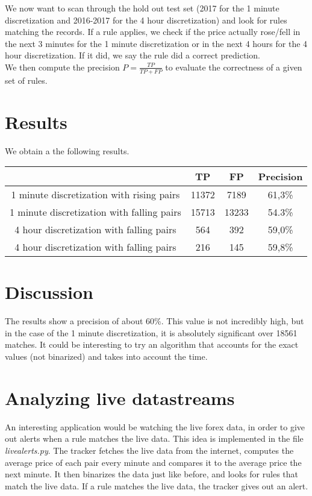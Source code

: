 \documentclass[paper=a4,fontsize=11pt,DIV=8,BCOR=5mm,twoside,pdftex]{scrartcl}
\begin{document}
	 We now want to scan through the hold out test set (2017 for the 1 minute discretization and 2016-2017 for the 4 hour discretization) and look for rules matching the records. If a rule applies, we check if the price actually rose/fell in the next 3 minutes for the 1 minute discretization or in the next 4 hours for the 4 hour discretization. If it did, we say the rule did a correct prediction.\\
	
	We then compute the precision $P = \frac{TP}{TP+FP}$ to evaluate the correctness of a given set of rules.\\
	
	\section{Results}
	
	We obtain a the following results.
	
	\begin{center}
		\begin{tabular}{ |c|c|c|c| }
			\hline
			&TP&FP&Precision\\
			\hline
			1 minute discretization with rising pairs&11372&7189&61,3\%\\
			1 minute discretization with falling pairs&15713&13233&54.3\%\\
			4 hour discretization with falling pairs&564&392&59,0\%\\
			4 hour discretization with falling pairs&216&145&59,8\%\\
			\hline
		\end{tabular}
	\end{center}
	
	\section{Discussion}
	
	The results show a precision of about 60\%. This value is not incredibly high, but in the case of the 1 minute discretization, it is absolutely significant over 18561 matches. It could be interesting to try an algorithm that accounts for the exact values (not binarized) and takes into account the time.
	
	\section{Analyzing live datastreams}
	
	An interesting application would be watching the live forex data, in order to give out alerts when a rule matches the live data. This idea is implemented in the file \textit{livealerts.py}. The tracker fetches the live data from the internet, computes the average price of each pair every minute and compares it to the average price the next minute. It then binarizes the data just like before, and looks for rules that match the live data. If a rule matches the live data, the tracker gives out an alert.
	
\end{document}
